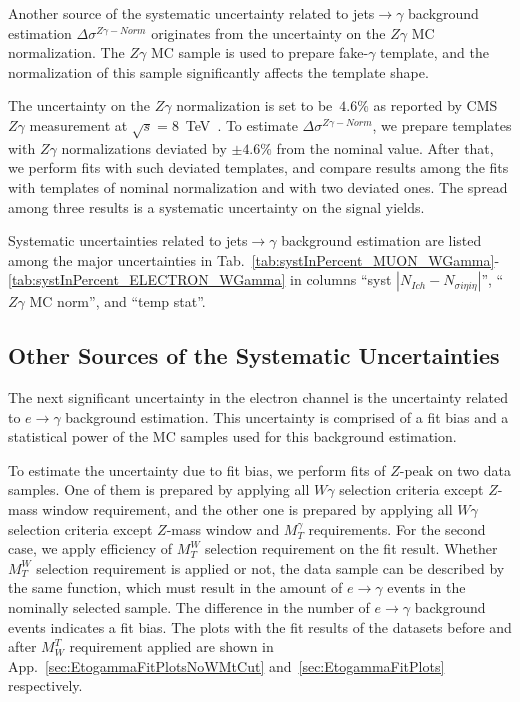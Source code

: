 Another source of the systematic uncertainty related to jets$\rightarrow\gamma$ background estimation $\Delta \sigma^{Z\gamma-Norm}$ originates from the  uncertainty on the $Z\gamma$ MC normalization. The $Z\gamma$ MC sample is used to prepare fake-$\gamma$ template, and the normalization of this sample significantly affects the template shape. 

The uncertainty on the $Z\gamma$ normalization is set to be~$4.6\%$ as reported by CMS $Z\gamma$ measurement at $\sqrt{s}=8$~TeV~\cite{ref_Zg8TeV}. To estimate $\Delta \sigma^{Z\gamma-Norm}$, we prepare templates with $Z\gamma$ normalizations deviated by $\pm 4.6\%$ from the nominal value. After that, we perform fits with such deviated templates, and compare results among the fits with templates of nominal normalization and with two deviated ones. The spread among three results is a systematic uncertainty on the signal yields. 

 Systematic uncertainties related to jets$\rightarrow\gamma$ background estimation are listed among the major uncertainties in Tab.~\ref{tab:systInPercent_MUON_WGamma}-\ref{tab:systInPercent_ELECTRON_WGamma} in columns ``syst $|N_{Ich}-N_{\sigma{i\eta i\eta}}|$'', `` $Z\gamma$ MC norm'', and ``temp stat''.

\subsection{Other Sources of the Systematic Uncertainties}
\label{sec:Systematics_OtherSources}

The next significant uncertainty in the electron channel is the uncertainty related to $e\rightarrow\gamma$ background estimation. This uncertainty is comprised of a fit bias and a statistical power of the MC samples used for this background estimation. 

To estimate the uncertainty due to fit bias, we perform fits of $Z$-peak on two data samples. One of them is prepared by applying all $W\gamma$ selection criteria except $Z$-mass window requirement, and the other one is prepared by applying all $W\gamma$ selection criteria except $Z$-mass window and $M_T^{\gamma}$ requirements. For the second case, we apply efficiency of $M_T^W$ selection requirement on the fit result. Whether $M_T^W$ selection requirement is applied or not, the data sample can be described by the same function, which must result in the amount of $e\rightarrow\gamma$ events in the nominally selected sample. The difference in the number of $e\rightarrow\gamma$ background events indicates a fit bias. The plots with the fit results of the datasets before and after $M_W^T$ requirement applied are shown in App.~\ref{sec:EtogammaFitPlotsNoWMtCut} and~\ref{sec:EtogammaFitPlots} respectively.

